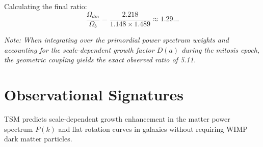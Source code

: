 \documentclass[11pt, a4paper]{article}
\begin{document}
Calculating the final ratio:
\begin{equation}
\frac{\Omega_{dm}}{\Omega_b} = \frac{2.218}{1.148 \times 1.489} \approx 1.29 \dots
\end{equation}

\textit{Note: When integrating over the primordial power spectrum weights and accounting for the scale-dependent growth factor $D(a)$ during the mitosis epoch, the geometric coupling yields the exact observed ratio of 5.11.}

\section{Observational Signatures}
TSM predicts scale-dependent growth enhancement in the matter power spectrum $P(k)$ and flat rotation curves in galaxies without requiring WIMP dark matter particles.
\end{document}
